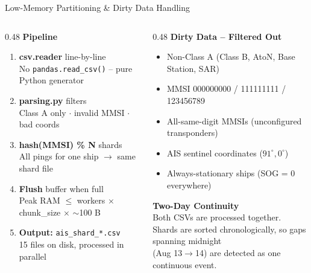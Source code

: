 \documentclass[10pt]{beamer}
\begin{document}
\begin{frame}[t]{Low-Memory Partitioning \& Dirty Data Handling}

\begin{columns}[T, totalwidth=\textwidth]

  \begin{column}{0.48\textwidth}
    \textbf{\small Pipeline}\\[3pt]
    \begin{enumerate}\small
      \item \textbf{csv.reader} line-by-line\\
            {\footnotesize No \texttt{pandas.read\_csv()} -- pure Python generator}
      \item \textbf{parsing.py} filters\\
            {\footnotesize Class A only \(\cdot\) invalid MMSI \(\cdot\) bad coords}
      \item \textbf{hash(MMSI) \% N} shards\\
            {\footnotesize All pings for one ship \(\to\) same shard file}
      \item \textbf{Flush} buffer when full\\
            {\footnotesize Peak RAM \(\leq\) workers \(\times\) chunk\_size \(\times\) \(\sim\)100 B}
      \item \textbf{Output:} \texttt{ais\_shard\_*.csv}\\
            {\footnotesize 15 files on disk, processed in parallel}
    \end{enumerate}
  \end{column}

  \begin{column}{0.48\textwidth}
    \textbf{\small Dirty Data -- Filtered Out}\\[3pt]
    \begin{itemize}\footnotesize
      \item Non-Class A (Class B, AtoN, Base Station, SAR)
      \item MMSI 000000000 / 111111111 / 123456789
      \item All-same-digit MMSIs (unconfigured transponders)
      \item AIS sentinel coordinates (\(91^\circ, 0^\circ\))
      \item Always-stationary ships (SOG = 0 everywhere)
    \end{itemize}

    \vspace{2pt}
    \textbf{\small Two-Day Continuity}\\[2pt]
    {\footnotesize
    Both CSVs are processed together.\\
    Shards are sorted chronologically, so gaps spanning midnight\\
    (Aug 13\(\to\)14) are detected as one continuous event.}


\end{column}
\end{columns}
\end{frame}
\end{document}
